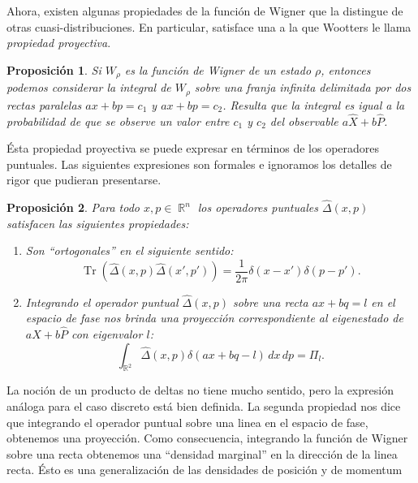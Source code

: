 \documentclass[a4paper]{report}
\DeclareMathOperator{\R}{\mathbb{R}}
\DeclareMathOperator{\Tr}{Tr}
\newtheorem{proposition}{Proposición}
\begin{document}
  Ahora, existen algunas propiedades de la función de Wigner
  que la distingue de otras cuasi-distribuciones. En
  particular, satisface una a la que Wootters
  \cite{wootters1987} le llama \textit{propiedad
  proyectiva}.
  \begin{proposition}
    \label{prop:proy_prop}
    Si $W_\rho$ es la función de Wigner de un estado $\rho$,
    entonces podemos considerar la integral de $W_\rho$
    sobre una franja infinita delimitada por dos rectas
    paralelas $ax+bp=c_1$ y $ax+bp=c_2$.  Resulta que la
    integral es igual a la probabilidad de que se observe un
    valor entre $c_1$ y $c_2$ del observable $a \hat X + b
    \hat P$. 
  \end{proposition}
  Ésta propiedad proyectiva se puede expresar en términos de
  los operadores puntuales. Las siguientes expresiones son
  formales e ignoramos los detalles de rigor que pudieran
  presentarse.
  \begin{proposition}
    Para todo $x,p \in \R^{n}$ los operadores puntuales
    $\hat\Delta(x,p)$ satisfacen las siguientes propiedades:
    \begin{enumerate}
      \item Son ``ortogonales'' en el siguiente sentido:
        \begin{equation}
          \Tr\left( \hat\Delta(x,p)\hat\Delta(x',p') \right) 
          = \frac{1}{2\pi} \delta(x-x')\delta(p-p').
        \end{equation}
      \item Integrando el operador puntual $\hat\Delta(x,p)$
        sobre una recta $ax+bq = l$ en el espacio de fase
        nos brinda una proyección correspondiente al
        eigenestado de $a\hat X + b \hat P$ con eigenvalor
        $l$:
        \begin{equation}
          \int_{\R^2} \hat\Delta(x,p) \delta(ax+bq-l) \, dx
          \, dp = \Pi_l.
        \end{equation}
    \end{enumerate}
  \end{proposition}
  La noción de un producto de deltas no tiene mucho sentido,
  pero la expresión análoga para el caso discreto está bien
  definida. La segunda propiedad nos dice que integrando el
  operador puntual sobre una linea en el espacio de fase,
  obtenemos una proyección. Como consecuencia, integrando la
  función de Wigner sobre una recta obtenemos una ``densidad
  marginal'' en la dirección de la linea recta. Ésto es una
  generalización de las densidades de posición y de momentum
\end{document}
